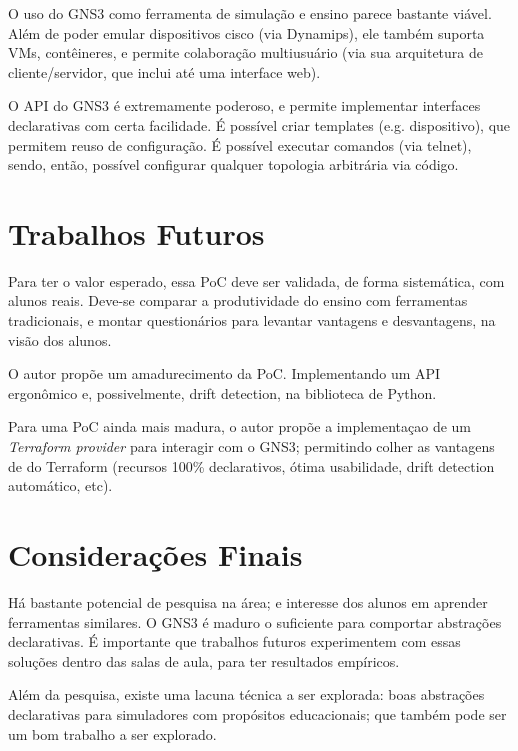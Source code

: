 \documentclass[12pt]{article}
\begin{document}
O uso do GNS3 como ferramenta de simulação e ensino parece bastante viável.
Além de poder emular dispositivos cisco (via Dynamips), ele também suporta VMs,
contêineres, e permite colaboração multiusuário (via sua arquitetura de
cliente/servidor, que inclui até uma interface web).

O API do GNS3 é extremamente poderoso, e permite implementar interfaces
declarativas com certa facilidade. É possível criar templates (e.g.
dispositivo), que permitem reuso de configuração. É possível executar comandos
(via telnet), sendo, então, possível configurar qualquer topologia arbitrária
via código.

\section{Trabalhos Futuros}

Para ter o valor esperado, essa PoC deve ser validada, de forma sistemática,
com alunos reais. Deve-se comparar a produtividade do ensino com ferramentas
tradicionais, e montar questionários para levantar vantagens e desvantagens, na
visão dos alunos.

O autor propõe um amadurecimento da PoC. Implementando um API ergonômico e,
possivelmente, drift detection, na biblioteca de Python.

Para uma PoC ainda mais madura, o autor propõe a implementaçao de um
\textit{Terraform provider} para interagir com o GNS3; permitindo colher as
vantagens de do Terraform (recursos 100\% declarativos, ótima usabilidade,
drift detection automático, etc).

\section{Considerações Finais}

Há bastante potencial de pesquisa na área; e interesse dos alunos em aprender
ferramentas similares. O GNS3 é maduro o suficiente para comportar abstrações
declarativas. É importante que trabalhos futuros experimentem com essas
soluções dentro das salas de aula, para ter resultados empíricos.

Além da pesquisa, existe uma lacuna técnica a ser explorada: boas abstrações
declarativas para simuladores com propósitos educacionais; que também pode ser
um bom trabalho a ser explorado.



\end{document}
